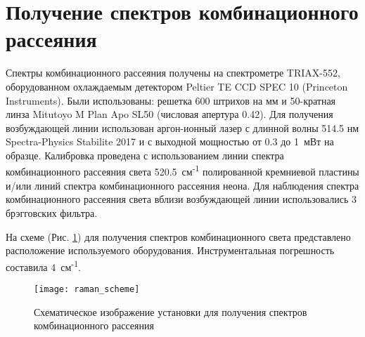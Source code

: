 \newpage
\section{Получение спектров комбинационного рассеяния} \label{sect2_6}

Спектры комбинационного рассеяния получены на спектрометре TRIAX-552, оборудованном охлаждаемым детектором Peltier TE CCD SPEC 10 (Princeton Instruments).
Были использованы: решетка 600 штрихов на мм и 50-кратная линза Mitutoyo M Plan Apo SL50 (числовая апертура 0.42).
Для получения возбуждающей линии использован аргон-ионный лазер с длинной волны 514.5 нм Spectra-Physics Stabilite 2017 и с выходной мощностью от 0.3 до 1~мВт на образце. Калибровка проведена с использованием линии спектра комбинационного рассеяния света 520.5~см\textsuperscript{-1} полированной кремниевой пластины и/или линий спектра комбинационного рассеяния неона.
Для наблюдения спектра комбинационного рассеяния света вблизи возбуждающей линии использовались 3  брэгговских фильтра.

На схеме (Рис. \ref{img:raman}) для получения спектров комбинационного света представлено расположение используемого оборудования. Инструментальная погрешность составила 4~см\textsuperscript{-1}.
\begin{figure}[p!]
  \begin{minipage}[ht]{0.99\linewidth}\centering
    \texttt{[image: raman\_scheme]}
  \end{minipage}


      \caption[Схематическое изображение установки для получения спектров комбинационного рассеяния]{Схематическое изображение установки для получения спектров комбинационного рассеяния}
    \label{img:raman}
\end{figure}
